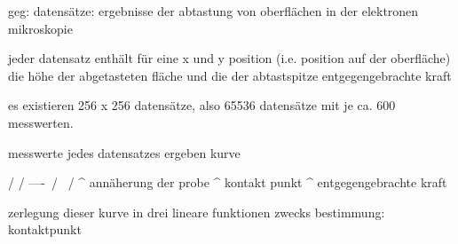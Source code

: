  
geg: datensätze: ergebnisse der abtastung von oberflächen in der elektronen mikroskopie


jeder datensatz enthält für eine x und y position (i.e. position auf der oberfläche) die höhe der abgetasteten fläche und die der abtastspitze entgegengebrachte kraft

es existieren 256 x 256 datensätze, also 65536 datensätze mit je ca. 600 messwerten.

messwerte jedes datensatzes ergeben kurve

           /
          /
----\    /
     \  /
      \/
 ^
 annäherung der probe
       ^
       kontakt punkt
         ^ entgegengebrachte kraft
         
zerlegung dieser kurve in drei lineare funktionen zwecks bestimmung: kontaktpunkt
